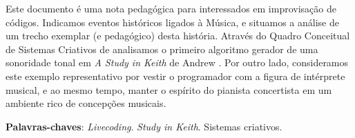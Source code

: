 \setlength{\absparsep}{18pt} %
\begin{resumo}

Este documento é uma nota pedagógica para interessados em improvisação de códigos. Indicamos eventos históricos ligados à Música, e situamos a análise de um trecho exemplar (e pedagógico) desta história. Através do Quadro Conceitual de Sistemas Criativos de  analisamos o primeiro algoritmo gerador de uma sonoridade tonal em \emph{A Study in Keith} de Andrew . Por outro lado, consideramos este exemplo representativo por vestir o programador com a figura de intérprete musical, e ao mesmo tempo, manter o espírito do pianista concertista em um ambiente rico de concepções musicais.

\vspace{\onelineskip}
\noindent
\textbf{Palavras-chaves}: \textit{Livecoding}. \emph{Study in Keith}. Sistemas criativos.
\end{resumo}

\begin{comment}
\begin{resumo}[Abstract]
 \begin{otherlanguage*}{english}

   \vspace{\onelineskip}
 
   \noindent 
   \textbf{Key-words}: latex. abntex. text editoration.
 \end{otherlanguage*}
\end{resumo}

\begin{comment}

\begin{resumo}[Résumé]
 \begi'n{otherlanguage*}{french}
    Il s'agit d'un résumé en français.
 
   \textbf{Mots-clés}: latex. abntex. publication de textes.
 \end{otherlanguage*}
\end{resumo}

\begin{resumo}[Resumen]
 \begin{otherlanguage*}{spanish}
   Este es el resumen en español.
  
   \textbf{Palabras clave}: latex. abntex. publicación de textos.
 \end{otherlanguage*}
\end{resumo}
\end{comment}